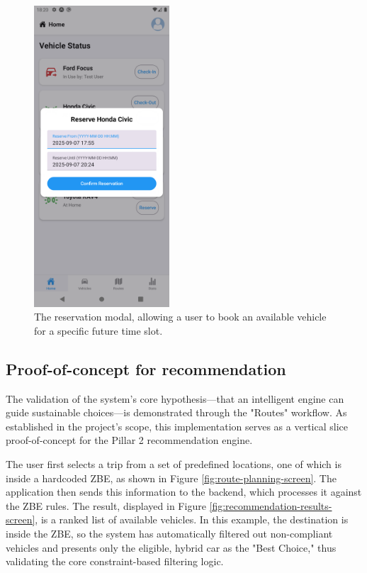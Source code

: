 \begin{figure}[H]
    \centering
    \includegraphics[width=0.45\textwidth]{images/results/reservation_modal.png}
    \caption{The reservation modal, allowing a user to book an available vehicle for a specific future time slot.}
    \label{fig:reservation-modal}
\end{figure}

\subsection{Proof-of-concept for recommendation}
The validation of the system's core hypothesis—that an intelligent engine can guide sustainable choices—is demonstrated through the "Routes" workflow. As established in the project's scope, this implementation serves as a vertical slice proof-of-concept for the Pillar 2 recommendation engine.

\textgap

The user first selects a trip from a set of predefined locations, one of which is inside a hardcoded ZBE, as shown in Figure \ref{fig:route-planning-screen}. The application then sends this information to the backend, which processes it against the ZBE rules. The result, displayed in Figure \ref{fig:recommendation-results-screen}, is a ranked list of available vehicles. In this example, the destination is inside the ZBE, so the system has automatically filtered out non-compliant vehicles and presents only the eligible, hybrid car as the "Best Choice," thus validating the core constraint-based filtering logic.

